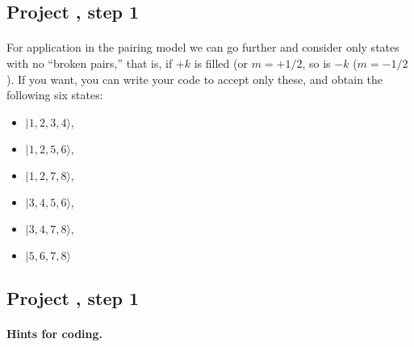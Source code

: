 \documentclass[%
twoside,                 %
final,                   %
10pt]{article}
\begin{document}
\subsection{Project , step 1}

\paragraph{}

For application in the pairing model we can go further and consider only states with 
no ``broken pairs,'' that is, if $+k$ is filled (or $m = +1/2$, so is $-k$ ($m=-1/2$). 
If you want, you can write your code to accept only these, and obtain the following 
six states:

\begin{itemize}
\item $|           1,           2 ,          3         ,       4  \rangle , $

\item $|            1      ,     2        ,        5         ,       6 \rangle , $

\item $|            1         ,       2     ,           7         ,       8  \rangle , $

\item $|            3        ,        4      ,          5          ,      6  \rangle , $

\item $|            3        ,        4      ,          7         ,       8  \rangle , $

\item $|            5        ,        6     ,           7     ,           8  \rangle $
\end{itemize}

\noindent





\subsection{Project , step 1}

\paragraph{Hints for coding.}
\end{document}
